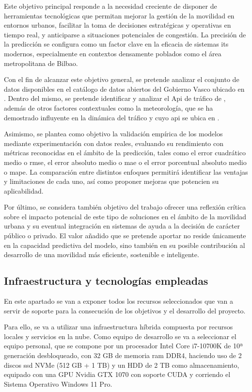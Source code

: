 Este objetivo principal responde a la necesidad creciente de disponer de herramientas tecnológicas que permitan mejorar la gestión de la movilidad en entornos urbanos, facilitar la toma de decisiones estratégicas y operativas en tiempo real, y anticiparse a situaciones potenciales de congestión. La precisión de la predicción se configura como un factor clave en la eficacia de sistemas \acrshort{its} modernos, especialmente en contextos densamente poblados como el área metropolitana de Bilbao. 

Con el fin de alcanzar este objetivo general, se pretende analizar el conjunto de datos disponibles en el catálogo de datos abiertos del Gobierno Vasco ubicado en \cite{openDataGv}. Dentro del mismo, se pretende identificar y analizar el Api de tráfico de \cite{apiTraffic}, además de otros factores contextuales como la meteorología, que se ha demostrado influyente en la dinámica del tráfico y cuyo \acrshort{api} se ubica en \cite{apiMeteo}.

Asimismo, se plantea como objetivo la validación empírica de los modelos mediante experimentación con datos reales, evaluando su rendimiento con métricas reconocidas en el ámbito de la predicción, tales como el error cuadrático medio o \acrshort{rmse}, el error absoluto medio o \acrshort{mae} o el error porcentual absoluto medio o \acrshort{mape}. La comparación entre distintos enfoques permitirá identificar las ventajas y limitaciones de cada uno, así como proponer mejoras que potencien su aplicabilidad.

Por último, se considera también objetivo del trabajo ofrecer una reflexión crítica sobre el impacto potencial de este tipo de soluciones en el ámbito de la movilidad urbana y su eventual integración en sistemas de ayuda a la decisión de carácter público o privado. El valor añadido que se pretende aportar no reside únicamente en la capacidad predictiva del modelo, sino también en su posible contribución al desarrollo de una movilidad más eficiente, sostenible e inteligente.

\subsection{Infraestructura y tecnologías empleadas}

En este apartado se van a exponer todos los recursos seleccionados que van a servir de soporte para la consecución de los objetivos y el desarrollo del proyecto.

Para ello, se va a utilizar una infraestructura híbrida compuesta por recursos locales y servicios en la nube.
Como equipo de desarrollo se va a seleccionar el equipo personal, que se compone por un procesador Intel Core i7-10700K de 10ª generación desbloqueado, con 32 GB de memoria \acrshort{ram} DDR4, haciendo uso de 2 discos \acrshort{ssd} NVMe (512 GB + 1 TB) y un HDD de 2 TB como almacenamiento, equipado con una GPU Nvidia GTX 1070 con soporte CUDA y corriendo el Sistema Operativo Windows 11 Pro.

